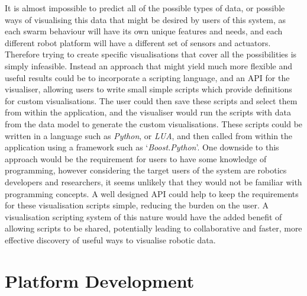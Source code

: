 It is almost impossible to predict all of the possible types of data, or possible ways of visualising this data that might be desired by users of this system, as each swarm behaviour will have its own unique features and needs, and each different robot platform will have a different set of sensors and actuators. Therefore trying to create specific visualisations that cover all the possibilities is simply infeasible. Instead an approach that might yield much more flexible and useful results could be to incorporate a scripting language, and an API for the visualiser, allowing users to write small simple scripts which provide definitions for custom visualisations. The user could then save these scripts and select them from within the application, and the visualiser would run the scripts with data from the data model to generate the custom visualisations. These scripts could be written in a language such as \textit{Python}, or \textit{LUA}, and then called from within the application using a framework such as `\textit{Boost.Python}'. One downside to this approach would be the requirement for users to have some knowledge of programming, however considering the target users of the system are robotics developers and researchers, it seems unlikely that they would not be familiar with programming concepts. A well designed API could help to keep the requirements for these visualisation scripts simple, reducing the burden on the user. A visualisation scripting system of this nature would have the added benefit of allowing scripts to be shared, potentially leading to collaborative and faster, more effective discovery of useful ways to visualise robotic data.


\section{Platform Development}

